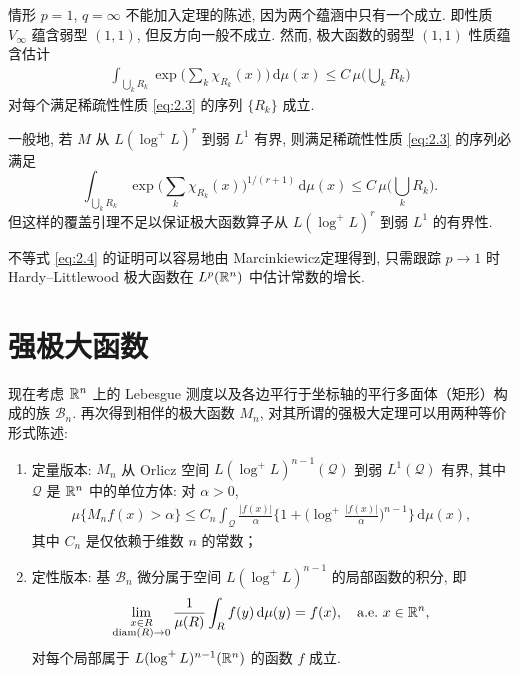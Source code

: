 \begin{remark}\label{rem:2.6}
情形 $p = 1$, $q = \infty$ 不能加入定理的陈述, 因为两个蕴涵中只有一个成立. 即性质 $V_{\infty}$ 蕴含弱型 $(1, 1)$, 但反方向一般不成立. 然而, 极大函数的弱型 $(1, 1)$ 性质蕴含估计
\begin{align*}
  \int_{\bigcup_{k}R_{k}}\exp\Big(\sum_{k}\chi_{R_{k}}(x)\Big)\,\mathrm{d}\mu(x)\leq C\,\mu\Big(\bigcup_{k}R_{k}\Big)
\end{align*}
对每个满足稀疏性性质 \eqref{eq:2.3} 的序列 $\{R_{k}\}$ 成立.

一般地, 若 $M$ 从 $L(\log^{+}L)^{r}$ 到弱 $L^{1}$ 有界, 则满足稀疏性性质 \eqref{eq:2.3} 的序列必满足
\begin{equation}\label{eq:2.4}
  \int_{\bigcup_{k}R_{k}}\exp\Big(\sum_{k}\chi_{R_{k}}(x)\Big)^{1/(r+1)}\,\mathrm{d}\mu(x)\leq C\,\mu\Big(\bigcup_{k}R_{k}\Big).
\end{equation}
但这样的覆盖引理不足以保证极大函数算子从 $L(\log^{+}L)^{r}$ 到弱 $L^{1}$ 的有界性.

不等式 \eqref{eq:2.4} 的证明可以容易地由 Marcinkiewicz定理得到, 只需跟踪 $p \to 1$ 时 Hardy--Littlewood 极大函数在 $L^p(\mathbb{R}^n)$ 中估计常数的增长.
\end{remark}

\section{强极大函数}

现在考虑 $\mathbb{R}^n$ 上的 Lebesgue 测度以及各边平行于坐标轴的平行多面体（矩形）构成的族 $\mathcal{B}_n$. 再次得到相伴的极大函数 $M_n$, 对其所谓的强极大定理可以用两种等价形式陈述:

\begin{enumerate}
\item[(a)] 定量版本: $M_n$ 从 Orlicz 空间 $L(\log^+L)^{n-1}(\mathcal{Q})$ 到弱 $L^1(\mathcal{Q})$ 有界, 其中 $\mathcal{Q}$ 是 $\mathbb{R}^n$ 中的单位方体: 对 $\alpha > 0$,
\begin{align*}
  \mu\{M_{n}f(x)>\alpha\}\leq C_{n}\int_{\mathcal{Q}}\frac{|f(x)|}{\alpha}\Big\{1+\Big(\log^{+}\frac{|f(x)|}{\alpha}\Big)^{n-1}\Big\}\,\mathrm{d}\mu(x),
\end{align*}
其中 $C_{n}$ 是仅依赖于维数 $n$ 的常数；

\item[(b)] 定性版本: 基 $\mathcal{B}_n$ 微分属于空间 $L(\log^+ L)^{n-1}$ 的局部函数的积分, 即
\begin{align*}
  \lim_{\substack{x\in R\\ \mathrm{diam}(R)\to 0}}\frac{1}{\mu(R)}\int_{R}f(y)\,\mathrm{d}\mu(y)=f(x),\quad\text{a.e.}\ x\in\R^{n},
\end{align*}
对每个局部属于 $L(\log^{+}L)^{n-1}(\mathbb{R}^{n})$ 的函数 $f$ 成立.
\end{enumerate}

